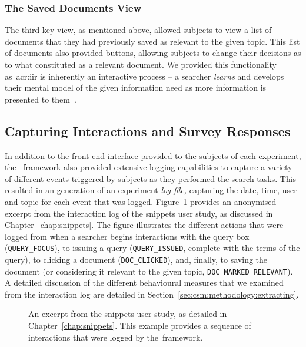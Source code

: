 \subsubsection{The Saved Documents View}
The third key view, as mentioned above, allowed subjects to view a list of documents that they had previously saved as relevant to the given topic. This list of documents also provided buttons, allowing subjects to change their decisions as to what constituted as a relevant document. We provided this functionality as~\gls{acr:iir} is inherently an interactive process -- a searcher \emph{learns} and develops their mental model of the given information need as more information is presented to them~\citep{ingwersen2005theturn}.

\subsection{Capturing Interactions and Survey Responses}\label{sec:csm:methodology:user:capturing}
In addition to the front-end interface provided to the subjects of each experiment, the \treconomics~framework also provided extensive logging capabilities to capture a variety of different events triggered by subjects as they performed the search tasks. This resulted in an generation of an experiment \emph{log file,} capturing the date, time, user and topic for each event that was logged. Figure~\ref{fig:log} provides an anonymised excerpt from the interaction log of the snippets user study, as discussed in Chapter~\ref{chap:snippets}. The figure illustrates the different actions that were logged from when a searcher begins interactions with the query box (\texttt{QUERY\_FOCUS}), to issuing a query (\texttt{QUERY\_ISSUED}, complete with the terms of the query), to clicking a document (\texttt{DOC\_CLICKED}), and, finally, to saving the document (or considering it relevant to the given topic, \texttt{DOC\_MARKED\_RELEVANT}). A detailed discussion of the different behavioural measures that we examined from the interaction log are detailed in Section~\ref{sec:csm:methodology:extracting}.

\begin{figure}[t!]
    \centering
    \caption[Experiment log file excerpt]{An excerpt from the snippets user study, as detailed in Chapter~\ref{chap:snippets}. This example provides a sequence of interactions that were logged by the\treconomics~framework.}
    \label{fig:log}
\end{figure}

